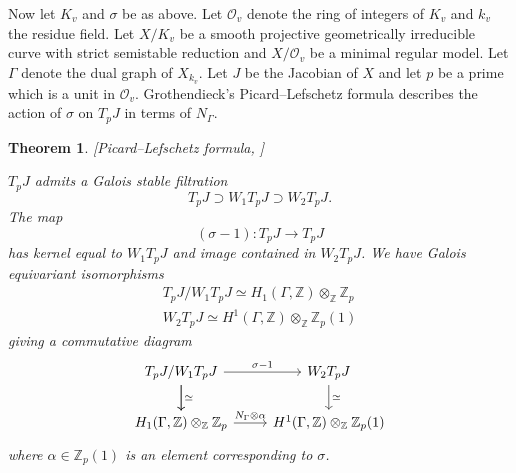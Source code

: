 \documentclass[11pt]{amsart}
\def\Z{\mathbb Z}
\theoremstyle{plain}
\newtheorem{theorem}{Theorem}
\theoremstyle{definition}
\begin{document}
Now let $K_v$ and $\sigma $ be as above. Let $\mathcal{O}_v$ denote the ring of integers of $K_v$ and $k _v$ the residue field. Let $X/K_v$ be a smooth projective geometrically irreducible curve with strict semistable reduction and $X/\mathcal{O}_v$ be a minimal regular model. Let $\Gamma $ denote the dual graph of $X_{k_v}$. Let $J$ be the Jacobian of $X$ and let $p$ be a prime which is a unit in $\mathcal{O}_v$. Grothendieck's Picard--Lefschetz formula describes the action of $\sigma $ on $T_p J$ in terms of $N_{\Gamma }$.
\begin{theorem}\label{thm:monodromy}[Picard--Lefschetz formula, \cite{SGA7}]

$T_p J$ admits a Galois stable filtration
\[
T_p J\supset W_1 T_p J \supset W_2 T_p J. 
\]
The map
\[
(\sigma -1):T_p J\to T_p J
\]
has kernel equal to $W_1 T_p J$ and image contained in $W_2 T_p J$. We have Galois equivariant isomorphisms
\begin{align*}
T_p J/W_1 T_p J\simeq H_1 (\Gamma ,\Z )\otimes _{\Z }\Z _p  \\
W_2 T_p J\simeq H^1 (\Gamma ,\Z )\otimes _{\Z }\Z _p (1)
\end{align*}
giving a commutative diagram
\[
\begin{tikzcd}
T_p J/W_1 T_p J \arrow[d, "\simeq "] \arrow[r, "\sigma -1"] \arrow[d] & W_2 T_p J \arrow[d, "\simeq"] \\
H_1 (\Gamma ,\Z )\otimes _{\Z }\Z _p \arrow[r, "N_\Gamma \otimes \alpha "]                                     & H^1 (\Gamma ,\Z )\otimes _{\Z }\Z _p (1)                    
\end{tikzcd}
\]
where $\alpha \in \Z _p (1)$ is an element corresponding to $\sigma $.
\end{theorem}
\end{document}

